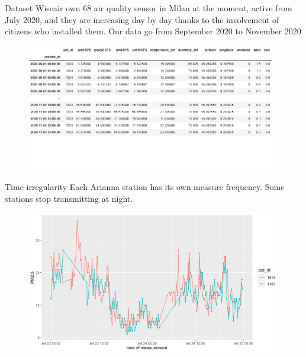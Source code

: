 \documentclass[10pt]{beamer}
\theoremstyle{remark}
\theoremstyle{definition}
\begin{document}
\begin{frame}{Dataset}
    Wiseair own 68 air quality sensor in Milan at the moment, active from July 2020, and they are increasing day by day thanks to the involvement of citizens who installed them. 
    Our data go from September 2020 to November 2020
    \begin{figure}[h]
	\centering
	\includegraphics[width=1\linewidth]{dataset.png}
\end{figure}
\end{frame}

\begin{frame}{Time irregularity}
    Each Arianna station has its own measure frequency. Some stations stop transmitting at night.
    \begin{figure}[h]
	\centering
	\includegraphics[width=1\linewidth]{timeIrregularity.png}
\end{figure}
\end{frame}
\end{document}

